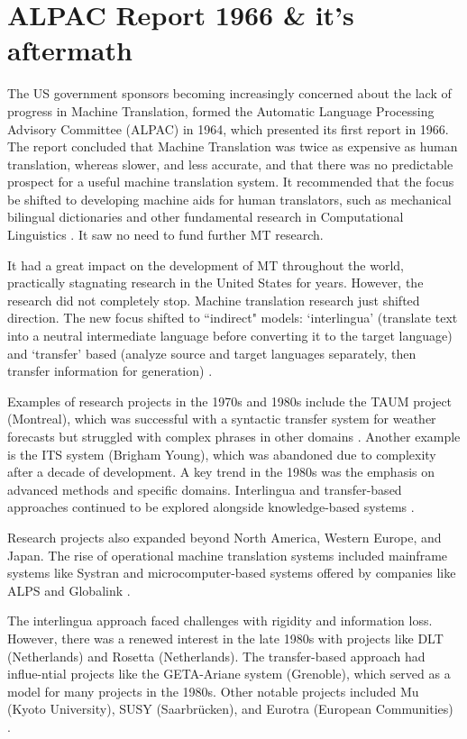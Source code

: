 \section{ALPAC Report 1966 \& it's aftermath}

The US government sponsors becoming increasingly concerned about the lack of progress in Machine Translation, formed the Automatic Language Processing Advisory Committee (ALPAC) in 1964, which presented its first report in 1966. The report concluded that Machine Translation was twice as expensive as human translation, whereas slower, and less accurate, and that there was no predictable prospect for a useful machine translation system. It recommended that the focus be shifted to developing machine aids for human translators, such as mechanical bilingual dictionaries and other fundamental research in Computational Linguistics \cite{hutchins2023machine}. It saw no need to fund further MT research.

It had a great impact on the development of MT throughout the world, practically stagnating research in the United States for years. However, the research did not completely stop. Machine translation research just shifted direction. The new focus shifted to ``indirect" models: `interlingua' (translate text into a neutral intermediate language before converting it to the target language) and `transfer' based (analyze source and target languages separately, then transfer information for generation) \cite{hutchins2023machine}.

Examples of research projects in the 1970s and 1980s include the TAUM project (Montreal), which was successful with a syntactic transfer system for weather forecasts but struggled with complex phrases in other domains \cite{hutchins1995machine}. Another example is the ITS system (Brigham Young), which was abandoned due to complexity after a decade of development. A key trend in the 1980s was the emphasis on advanced methods and specific domains. Interlingua and transfer-based approaches continued to be explored alongside knowledge-based systems \cite{hutchins2023machine}. 

Research projects also expanded beyond North America, Western Europe, and Japan. The rise of operational machine translation systems included mainframe systems like Systran and microcomputer-based systems offered by companies like ALPS and Globalink \cite{hutchins1995machine}.

The interlingua approach faced challenges with rigidity and information loss. However, there was a renewed interest in the late 1980s with projects like DLT (Netherlands) and Rosetta (Netherlands). The transfer-based approach had influe-ntial projects like the GETA-Ariane system (Grenoble), which served as a model for many projects in the 1980s. Other notable projects included Mu (Kyoto University), SUSY (Saarbrücken), and Eurotra (European Communities) \\ \cite{hutchins2023machine}.

